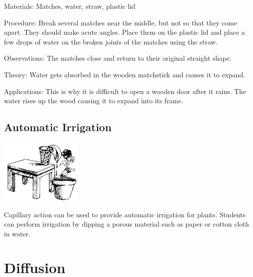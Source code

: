 \begin{multicols}{2}
\begin{description*}
\item[Materials:]{Matches, water, straw, plastic lid}
\item[Procedure:]{Break several matches near the middle, but not so that they come apart. They should make acute angles. Place them on the plastic lid and place a few drops of water on the broken joints of the matches using the straw.}
\item[Observations:]{The matches close and return to their original straight shape.}
\item[Theory:]{Water gets absorbed in the wooden matchstick and causes it to expand.}
\item[Applications:]{This is why it is difficult to open a wooden door after it rains. The water rises up the wood causing it to expand into its frame.}
\end{description*}

\subsection{Automatic Irrigation}

\begin{center}
\includegraphics[width=0.3\textwidth]{./img/source/irrigation.png}
\end{center}

Capillary action can be used to provide automatic irrigation for plants. Students can perform irrigation by dipping a porous material such as paper or cotton cloth in water.


\section*{Diffusion}


\end{multicols}
